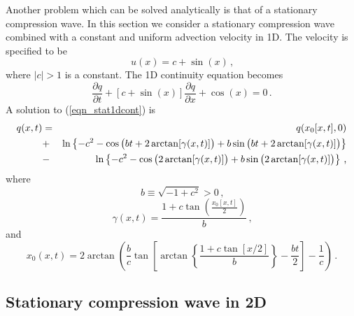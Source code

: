 \documentclass[11pt]{book}
\begin{document}
Another problem which can be solved analytically is that of a stationary compression wave.  In this section we consider a stationary compression wave combined with a constant and uniform advection velocity in 1D.  The velocity is specified to be
\begin{equation}
\label{eqn_statu1d}
u(x) = c + \sin(x) \,\mbox{,}
\end{equation}
where $|c|>1$ is a constant.  The 1D continuity equation becomes
\begin{equation}
\label{eqn_stat1dcont}
\frac{\partial q}{\partial t} + [c + \sin(x)] \frac{\partial q}{\partial x} + \cos(x) = 0 \,\mbox{.}
\end{equation}
A solution to (\ref{eqn_stat1dcont}) is
\begin{eqnarray}
\label{eqn_stat1dsoln}
q(x,t) &=& q(x_0[x,t],0) \nonumber \vspace{0.3cm}\\
&+& \ln\left\{ -c^2 - \cos\big(bt + 2\arctan[\gamma(x,t)] \big) + b\sin\big(bt + 2\arctan[\gamma(x,t)] \big) \right\} \nonumber \vspace{0.3cm}\\
&-& \ln\left\{ -c^2 - \cos\big( 2\arctan[\gamma(x,t)] \big) + b\sin\big( 2\arctan[\gamma(x,t)] \big) \right\} \,\mbox{,}
\end{eqnarray}
where
\begin{equation}
\label{eqn_b}
b \equiv \sqrt{-1 + c^2} > 0 \,\mbox{,}
\end{equation}
\begin{equation}
\label{eqn_gamma}
\gamma(x,t) = \frac{ 1 + c\tan\left( \frac{x_0[x,t]}{2} \right) }{b} \,\mbox{,}
\end{equation}
and
\begin{equation}
\label{eqn_stat1dx0}
x_0(x,t) = 2\arctan\left( \frac{b}{c} \tan \left[ \arctan\left\{ \frac{1+c\tan[x/2]}{b} \right\} - \frac{bt}{2} \right] - \frac{1}{c} \right) \,\mbox{.}
\end{equation}

\subsection{Stationary compression wave in 2D}
\label{stationary_2d}
\end{document}
